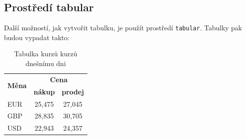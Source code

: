 \documentclass[a4paper, 11pt]{article}
\begin{document}
\subsection{Prostředí tabular}
Další možností, jak vytvořit tabulku, je použít prostředí \verb|tabular|. Tabulky pak budou vypadat takto\footnotemark:

\begin{table}[h]
    \centering
    \begin{tabular}{|l|c|c|}
        \hline \multirow{2}{*}{ \textbf{Měna} } & \multicolumn{2}{|c|}{ \textbf{Cena}} \\
        \cline { 2 - 3 } & \textbf{nákup} & \textbf{prodej} \\
        \hline 
        EUR & 25,475 & 27,045 \\
        GBP & 28,835 & 30,705 \\
        USD & 22,943 & 24,357 \\
        \hline
    \end{tabular}
    \caption{Tabulka kurzů kurzů dnešnímu dni}
    \label{tab:kurzy}
\end{table}
\end{document}
